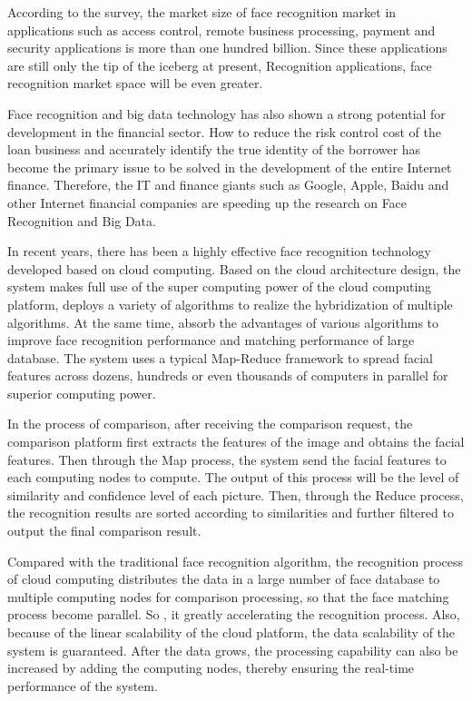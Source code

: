 \documentclass[sigconf]{acmart}
\begin{document}
According to the survey, the market size of face recognition market in applications such as access control, remote business processing, payment and security applications is more than one hundred billion. Since these applications are still only the tip of the iceberg at present, Recognition applications, face recognition market space will be even greater.

Face recognition and big data technology has also shown a strong potential for development in the financial sector. How to reduce the risk control cost of the loan business and accurately identify the true identity of the borrower has become the primary issue to be solved in the development of the entire Internet finance. Therefore, the IT and finance giants such as Google, Apple, Baidu and other Internet financial companies are speeding up the research on Face Recognition and Big Data.

In recent years, there has been a highly effective face recognition technology developed based on cloud computing. Based on the cloud architecture design, the system makes full use of the super computing power of the cloud computing platform, deploys a variety of algorithms to realize the hybridization of multiple algorithms. At the same time, absorb the advantages of various algorithms to improve face recognition performance and matching performance of large database. The system uses a typical Map-Reduce framework to spread facial features across dozens, hundreds or even thousands of computers in parallel for superior computing power.

In the process of comparison, after receiving the comparison request, the comparison platform first extracts the features of the image and obtains the facial features. Then through the Map process, the system send the facial features to each computing nodes to compute. The output of this process will be the level of similarity and confidence level of each picture. Then, through the Reduce process, the recognition results are sorted according to similarities and further filtered to output the final comparison result\cite{bigdata}. 

Compared with the traditional face recognition algorithm, the recognition process of cloud computing distributes the data in a large number of face database to multiple computing nodes for comparison processing,  so that the face matching process become parallel. So , it greatly accelerating the recognition process. Also, because of the linear scalability of the cloud platform, the data scalability of the system is guaranteed. After the data grows, the processing capability can also be increased by adding the computing nodes, thereby ensuring the real-time performance of the system.
\end{document}
